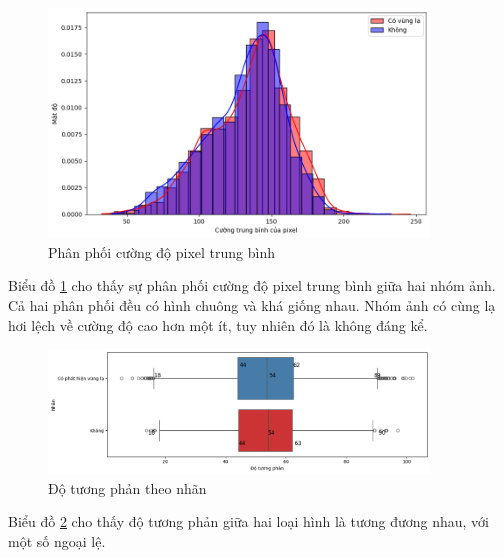     \begin{figure}[htp]
        \centering
        \includegraphics[width=0.90\textwidth]{images/Img_lung_intensity.png}
        \caption{Phân phối cường độ pixel trung bình}
        \label{fig:Img_lung_intensity}
    \end{figure}
    \FloatBarrier

    Biểu đồ \ref{fig:Img_lung_intensity} cho thấy sự phân phối cường độ pixel trung bình giữa hai nhóm ảnh. Cả hai phân phối đều có hình chuông và khá giống nhau. Nhóm ảnh có cùng lạ hơi lệch về cường độ cao hơn một ít, tuy nhiên đó là không đáng kể.

    \begin{figure}[htp]
        \centering
        \includegraphics[width=0.90\textwidth]{images/Img_lung_contrast.png}
        \caption{Độ tương phản theo nhãn}
        \label{fig:Img_lung_contrast}
    \end{figure}
    \FloatBarrier

     Biểu đồ \ref{fig:Img_lung_contrast} cho thấy độ tương phản giữa hai loại hình là tương đương nhau, với một số ngoại lệ.

